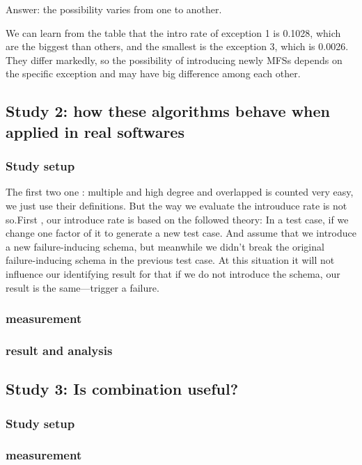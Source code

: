 \documentclass[10pt,journal,cspaper,compsoc]{IEEEtran}
\begin{document}
Answer: the possibility varies from one to another.

We can learn from the table that the intro rate of exception 1 is 0.1028, which are the biggest than others, and the smallest is the exception 3, which is 0.0026. They differ markedly, so the possibility of introducing newly MFSs depends on the specific exception and may have big difference among each other.

\subsection{Study 2: how these algorithms behave when applied in real softwares}

\subsubsection{Study setup}
The first two one : multiple and high degree and overlapped is counted very easy, we just use their definitions. But the way we evaluate the introuduce rate is not so.First , our introduce rate is based on the followed theory:
In a test case, if we change one factor of it to generate a new test case.  And assume that we introduce a new failure-inducing schema, but meanwhile we didn’t break the original failure-inducing schema in the previous test case.
 At this situation it will not influence our identifying result for that if we do not introduce the schema, our result is the same---trigger a failure.

 \subsubsection{measurement}

 \subsubsection{result and analysis}

 \subsection{Study 3: Is combination useful?}
 \subsubsection{Study setup}
 \subsubsection{measurement}
\end{document}
